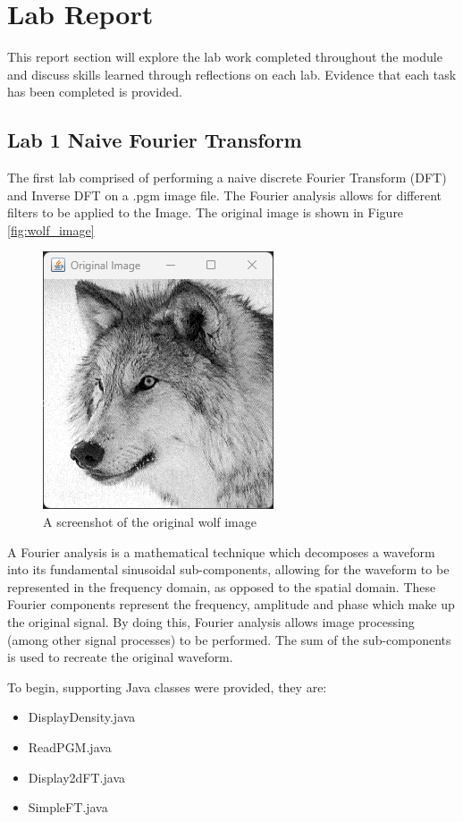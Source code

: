 \chapter{Lab Report}
This report section will explore the lab work completed throughout the module and discuss skills learned through reflections on each lab. Evidence that each task has been completed is provided.

\section{Lab 1 Naive Fourier Transform}

    The first lab comprised of performing a naive discrete Fourier Transform (DFT) and Inverse DFT on a .pgm image file. The Fourier analysis allows for different filters to be applied to the Image. The original image is shown in Figure \autoref{fig:wolf_image}

    \begin{figure}[H]
        \centering
            \includegraphics[width=0.49\columnwidth]{Figures/Week 1/W1-Wolf-Original.png}
            \caption{A screenshot of the original wolf image}
            \label{fig:wolf_image}
    \end{figure}
    
    A Fourier analysis is a mathematical technique which decomposes a waveform into its fundamental sinusoidal sub-components, allowing for the waveform to be represented in the frequency domain, as opposed to the spatial domain. These Fourier components represent the frequency, amplitude and phase which make up the original signal. By doing this, Fourier analysis allows image processing (among other signal processes) to be performed. The sum of the sub-components is used to recreate the original waveform. 
    

    To begin, supporting Java classes were provided, they are: 
    \begin{itemize}
        \item DisplayDensity.java
        \item ReadPGM.java
        \item Display2dFT.java
        \item SimpleFT.java
    \end{itemize}
        
